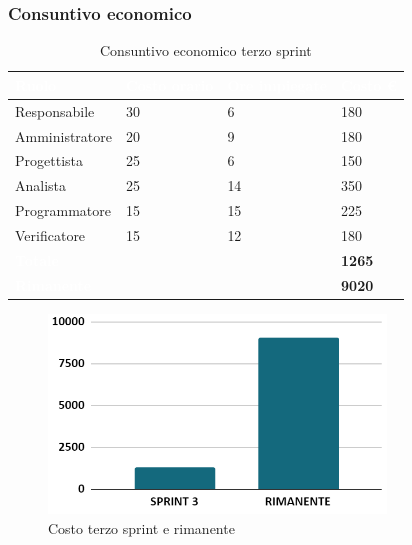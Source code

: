 \newpage
\subsubsection{Consuntivo economico}
{
\setlength{\tabcolsep}{10pt}
\renewcommand{\arraystretch}{1.5}
\begin{table}[h]
    \centering
    \begin{tabularx}{\textwidth}{| l | l | l | X |}
        \hline
        \rowcolor{headerrow} \textbf{\textcolor{white}{Ruolo}} & \textbf{\textcolor{white}{Costo orario}} & \textbf{\textcolor{white}{Ore impiegate}} & \textbf{\textcolor{white}{Costo €}} \\
        \hline
        Responsabile & 30 & 6 & 180\\
        \hline
        Amministratore & 20 & 9 & 180\\
        \hline
        Progettista& 25 & 6 & 150\\
        \hline
        Analista & 25 & 14 & 350\\
        \hline
        Programmatore & 15 & 15 & 225\\
        \hline
        Verificatore & 15 & 12 & 180\\
        \hline
        \cellcolor{headerrow} \textbf{\textcolor{white}{Totale}} &  &  & \textbf{1265}\\
        \hline
        \cellcolor{headerrow} \textbf{\textcolor{white}{Rimanente}} &  &  & \textbf{9020}\\
        \hline
    \end{tabularx}
    \caption{Consuntivo economico terzo sprint}
    \label{tab:consuntivocostiterzosprint}
\end{table}
}

\begin{figure}[h!]
    \centering
    \includegraphics[width=0.8\textwidth]{cons3costo.png}
    \caption{Costo terzo sprint e rimanente}
    \label{fig:consuntivocostoterzpsprint}
\end{figure}


